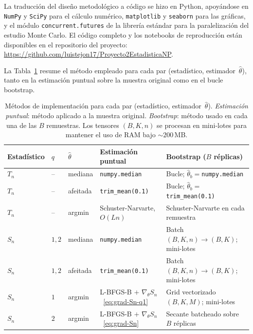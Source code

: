 
La traducción del diseño metodológico a código se hizo en Python, apoyándose en \texttt{NumPy} y \texttt{SciPy} para el cálculo numérico, \texttt{matplotlib} y \texttt{seaborn} para las gráficas, y el módulo \texttt{concurrent.futures} de la librería estándar para la paralelización del estudio Monte Carlo. El código completo y los notebooks de reproducción están disponibles en el repositorio del proyecto: \url{https://github.com/luistejon17/Proyecto2EstadisticaNP}.

La Tabla~\ref{tab:impl-summary} resume el método empleado para cada par (estadístico, estimador~$\hat\theta$), tanto en la estimación puntual sobre la muestra original como en el bucle bootstrap.

\begin{table}[H]
\centering
\small
\caption{Métodos de implementación para cada par (estadístico, estimador~$\hat\theta$). \emph{Estimación puntual}: método aplicado a la muestra original. \emph{Bootstrap}: método usado en cada una de las $B$ remuestras. Los tensores $(B,K,n)$ se procesan en mini-lotes para mantener el uso de RAM bajo $\sim\!200$\,MB.}
\label{tab:impl-summary}
\begin{tabular}{@{}lllp{4.6cm}p{4.6cm}@{}}
\toprule
Estadístico & $q$ & $\hat\theta$ & Estimación puntual & Bootstrap ($B$ réplicas) \\
\midrule
$T_n$ & -- & mediana  & \texttt{numpy.median}          & Bucle; $\hat\theta_b{=}$\texttt{numpy.median} \\
$T_n$ & -- & afeitada & \texttt{trim\_mean(0.1)}        & Bucle; $\hat\theta_b{=}$\texttt{trim\_mean(0.1)} \\
$T_n$ & -- & argmin   & Schuster-Narvarte, $O(Ln)$     & Schuster-Narvarte en cada remuestra \\
\midrule
$S_n$ & $1,2$ & mediana  & \texttt{numpy.median}       & Batch $(B,K,n)\!\to\!(B,K)$; mini-lotes \\
$S_n$ & $1,2$ & afeitada & \texttt{trim\_mean(0.1)}     & Batch $(B,K,n)\!\to\!(B,K)$; mini-lotes \\
$S_n$ & $1$   & argmin   & L-BFGS-B $+$ $\nabla_\theta S_n$~\eqref{eq:grad-Sn-q1} & Grid vectorizado $(B,K,M)$; mini-lotes \\
$S_n$ & $2$   & argmin   & L-BFGS-B $+$ $\nabla_\theta S_n$~\eqref{eq:grad-Sn}    & Secante batcheado sobre $B$ réplicas \\
\bottomrule
\end{tabular}
\end{table}

